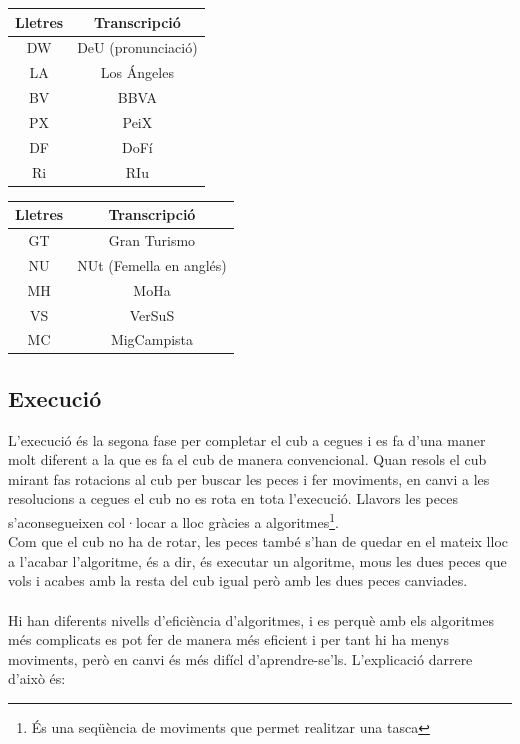 \begin{table}[h]
    \begin{minipage}{.5\linewidth}
        \centering
        \begin{tabular}{|c|c|}
            \hline
            Lletres & Transcripció\\
            \hline
            DW & DeU (pronunciació)\\
            \hline
            LA & Los Ángeles\\
            \hline
            BV & BBVA\\
            \hline
            PX & PeiX\\
            \hline
            DF &  DoFí\\
            \hline 
            Ri & RIu  \\
            \hline
        \end{tabular}
    \end{minipage}
    \begin{minipage}{.5\linewidth}
        \centering
        \begin{tabular}{|c|c|}
            \hline
            Lletres & Transcripció\\
            \hline
            GT & Gran Turismo \\
            \hline
            NU & NUt (Femella en anglés)\\
            \hline
            MH & MoHa\\
            \hline
            VS &  VerSuS\\
            \hline 
            MC &  MigCampista\\
            \hline
        \end{tabular}
    \end{minipage} 
\end{table}





\subsection{Execució}

L'execució és la segona fase per completar el cub a cegues i es fa d'una maner molt diferent a la que es fa el cub de manera convencional. Quan resols el cub mirant fas rotacions al cub per buscar les peces i fer moviments, en canvi a les resolucions a cegues el cub no es rota en tota l'execució. Llavors les peces s'aconsegueixen col·locar a lloc gràcies a algoritmes\footnote{És una seqüència de moviments que permet realitzar una tasca}.
\\Com que el cub no ha de rotar, les peces també s'han de quedar en el mateix lloc a l'acabar l'algoritme, és a dir, és executar un algoritme, mous les dues peces que vols i acabes amb la resta del cub igual però amb les dues peces canviades. 
\\\\Hi han diferents nivells d'eficiència d'algoritmes, i es perquè amb els algoritmes més complicats es pot fer de manera més eficient i per tant hi ha menys moviments, però en canvi és més difícl d'aprendre-se'ls. L'explicació darrere d'això és:


